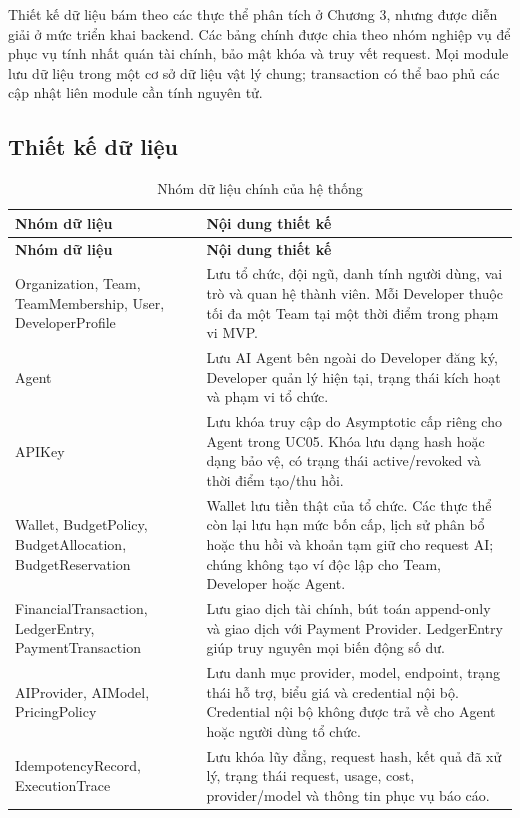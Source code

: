 Thiết kế dữ liệu bám theo các thực thể phân tích ở Chương 3, nhưng được diễn giải ở mức triển khai backend. Các bảng chính được chia theo nhóm nghiệp vụ để phục vụ tính nhất quán tài chính, bảo mật khóa và truy vết request. Mọi module lưu dữ liệu trong một cơ sở dữ liệu vật lý chung; transaction có thể bao phủ các cập nhật liên module cần tính nguyên tử.

\subsection*{Thiết kế dữ liệu}

\begin{longtable}{|L{0.28\textwidth}|L{0.62\textwidth}|}
\caption{Nhóm dữ liệu chính của hệ thống}\\
\hline
\textbf{Nhóm dữ liệu} & \textbf{Nội dung thiết kế} \\
\hline
\endfirsthead
\hline
\textbf{Nhóm dữ liệu} & \textbf{Nội dung thiết kế} \\
\hline
\endhead
Organization, Team, TeamMembership, User, DeveloperProfile & Lưu tổ chức, đội ngũ, danh tính người dùng, vai trò và quan hệ thành viên. Mỗi Developer thuộc tối đa một Team tại một thời điểm trong phạm vi MVP.\\
\hline
Agent & Lưu AI Agent bên ngoài do Developer đăng ký, Developer quản lý hiện tại, trạng thái kích hoạt và phạm vi tổ chức.\\
\hline
APIKey & Lưu khóa truy cập do Asymptotic cấp riêng cho Agent trong UC05. Khóa lưu dạng hash hoặc dạng bảo vệ, có trạng thái active/revoked và thời điểm tạo/thu hồi.\\
\hline
Wallet, BudgetPolicy, BudgetAllocation, BudgetReservation & Wallet lưu tiền thật của tổ chức. Các thực thể còn lại lưu hạn mức bốn cấp, lịch sử phân bổ hoặc thu hồi và khoản tạm giữ cho request AI; chúng không tạo ví độc lập cho Team, Developer hoặc Agent.\\
\hline
FinancialTransaction, LedgerEntry, PaymentTransaction & Lưu giao dịch tài chính, bút toán append-only và giao dịch với Payment Provider. LedgerEntry giúp truy nguyên mọi biến động số dư.\\
\hline
AIProvider, AIModel, PricingPolicy & Lưu danh mục provider, model, endpoint, trạng thái hỗ trợ, biểu giá và credential nội bộ. Credential nội bộ không được trả về cho Agent hoặc người dùng tổ chức.\\
\hline
IdempotencyRecord, ExecutionTrace & Lưu khóa lũy đẳng, request hash, kết quả đã xử lý, trạng thái request, usage, cost, provider/model và thông tin phục vụ báo cáo.\\
\hline
\end{longtable}

